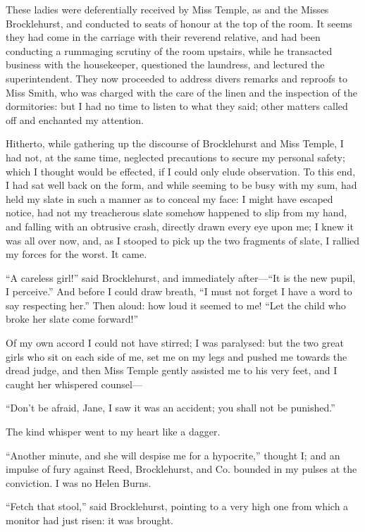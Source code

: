 These ladies were deferentially received by Miss Temple, as \Mrs{} and the
Misses Brocklehurst, and conducted to seats of honour at the top of the
room. It seems they had come in the carriage with their reverend
relative, and had been conducting a rummaging scrutiny of the room
upstairs, while he transacted business with the housekeeper, questioned
the laundress, and lectured the superintendent. They now proceeded to
address divers remarks and reproofs to Miss Smith, who was charged with
the care of the linen and the inspection of the dormitories: but I had
no time to listen to what they said; other matters called off and
enchanted my attention.

Hitherto, while gathering up the discourse of \Mr{} Brocklehurst and Miss
Temple, I had not, at the same time, neglected precautions to secure my
personal safety; which I thought would be effected, if I could only
elude observation. To this end, I had sat well back on the form, and
while seeming to be busy with my sum, had held my slate in such a manner
as to conceal my face: I might have escaped notice, had not my
treacherous slate somehow happened to slip from my hand, and falling
with an obtrusive crash, directly drawn every eye upon me; I knew it was
all over now, and, as I stooped to pick up the two fragments of slate, I
rallied my forces for the worst. It came.

\enquote{A careless girl!} said \Mr{} Brocklehurst, and immediately
after---\enquote{It is the new pupil, I perceive.} And before I could
draw breath, \enquote{I must not forget I have a word to say respecting
	her.} Then aloud: how loud it seemed to me! \enquote{Let the child who
	broke her slate come forward!}

Of my own accord I could not have stirred; I was paralysed: but the two
great girls who sit on each side of me, set me on my legs and pushed me
towards the dread judge, and then Miss Temple gently assisted me to his
very feet, and I caught her whispered counsel---

\enquote{Don't be afraid, Jane, I saw it was an accident; you shall not
	be punished.}

The kind whisper went to my heart like a dagger.

\enquote{Another minute, and she will despise me for a hypocrite,}
thought I; and an impulse of fury against Reed, Brocklehurst, and Co.
bounded in my pulses at the conviction. I was no Helen Burns.

\enquote{Fetch that stool,} said \Mr{} Brocklehurst, pointing to a very
high one from which a monitor had just risen: it was brought.

